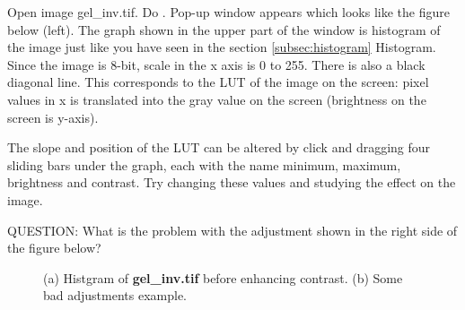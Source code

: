 \begin{indentexercise}{1}
Open image gel\_inv.tif. Do . Pop-up window appears which looks like the
figure below (left). The graph shown in the upper part of the window is
histogram of the image just like you have seen in the section \ref{subsec:histogram} Histogram. Since the image is 8-bit, scale in the x axis is 0 to 255.
There is also a black diagonal line. This corresponds to the LUT of the
image on the screen: pixel values in x is translated into the gray
value on the screen (brightness on the screen is y-axis). 

The slope and position of the LUT can be altered by click and dragging
four sliding bars under the graph, each with the name minimum, maximum,
brightness and contrast. Try changing these values and studying the
effect on the image. 

QUESTION: What is the problem with the adjustment shown in the
right side of the figure below?

\begin{figure}[htbp]
 \centering
 \caption{ (a) Histgram of \textbf{gel\_inv.tif} before enhancing contrast. (b) Some bad adjustments example. }
 \label{fig:quizEnhanceContrast}
\end{figure} 

\end{indentexercise}

